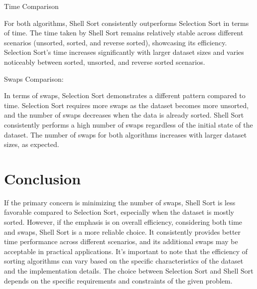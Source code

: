 \documentclass{article}
\begin{document}
\begin{center}
Time Comparison
\end{center}
For both algorithms, Shell Sort consistently outperforms Selection Sort in terms of time.
The time taken by Shell Sort remains relatively stable across different scenarios (unsorted, sorted, and reverse sorted), showcasing its efficiency.
Selection Sort's time increases significantly with larger dataset sizes and varies noticeably between sorted, unsorted, and reverse sorted scenarios.

\begin{center}
Swaps Comparison:
\end{center}

In terms of swaps, Selection Sort demonstrates a different pattern compared to time.
Selection Sort requires more swaps as the dataset becomes more unsorted, and the number of swaps decreases when the data is already sorted.
Shell Sort consistently performs a high number of swaps regardless of the initial state of the dataset.
The number of swaps for both algorithms increases with larger dataset sizes, as expected.

\section{Conclusion}

If the primary concern is minimizing the number of swaps, Shell Sort is less favorable compared to Selection Sort, especially when the dataset is mostly sorted.
However, if the emphasis is on overall efficiency, considering both time and swaps, Shell Sort is a more reliable choice. It consistently provides better time performance across different scenarios, and its additional swaps may be acceptable in practical applications.
It's important to note that the efficiency of sorting algorithms can vary based on the specific characteristics of the dataset and the implementation details. The choice between Selection Sort and Shell Sort depends on the specific requirements and constraints of the given problem.
\end{document}
